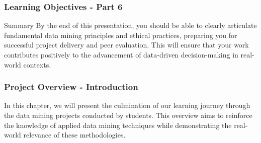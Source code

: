 \documentclass[aspectratio=169]{beamer}
\begin{document}
\begin{frame}[fragile]
    \frametitle{Learning Objectives - Part 6}
    \begin{block}{Summary}
        By the end of this presentation, you should be able to clearly articulate fundamental data mining principles and ethical practices, preparing you for successful project delivery and peer evaluation. This will ensure that your work contributes positively to the advancement of data-driven decision-making in real-world contexts.
    \end{block}
\end{frame}

\begin{frame}[fragile]
    \frametitle{Project Overview - Introduction}
    In this chapter, we will present the culmination of our learning journey through the data mining projects conducted by students. 
    This overview aims to reinforce the knowledge of applied data mining techniques while demonstrating the real-world relevance of these methodologies.
\end{frame}
\end{document}
